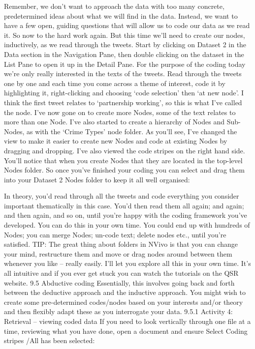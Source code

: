 \documentclass[
]{book}
\begin{document}
Remember, we don't want to approach the data with too many concrete, predetermined ideas about what we will find in the data. Instead, we want to have a few open, guiding questions that will allow us to code our data as we read it.
So now to the hard work again. But this time we'll need to create our nodes, inductively, as we read through the tweets.
Start by clicking on Dataset 2 in the Data section in the Navigation Pane, then double clicking on the dataset in the List Pane to open it up in the Detail Pane. For the purpose of the coding today we're only really interested in the texts of the tweets.
Read through the tweets one by one and each time you come across a theme of interest, code it by highlighting it, right-clicking and choosing `code selection' then `at new node'. I think the first tweet relates to `partnership working', so this is what I've called the node. I've now gone on to create more Nodes, some of the text relates to more than one Node. I've also started to create a hierarchy of Nodes and Sub-Nodes, as with the `Crime Types' node folder. As you'll see, I've changed the view to make it easier to create new Nodes and code at existing Nodes by dragging and dropping. I've also viewed the code stripes on the right hand side. You'll notice that when you create Nodes that they are located in the top-level Nodes folder. So once you've finished your coding you can select and drag them into your Dataset 2 Nodes folder to keep it all well organised:

In theory, you'd read through all the tweets and code everything you consider important thematically in this case. You'd then read them all again; and again; and then again, and so on, until you're happy with the coding framework you've developed. You can do this in your own time. You could end up with hundreds of Nodes; you can merge Nodes; un-code text; delete nodes etc., until you're satisfied.
TIP: The great thing about folders in NVivo is that you can change your mind, restructure them and move or drag nodes around between them whenever you like -- really easily. I'll let you explore all this in your own time. It's all intuitive and if you ever get stuck you can watch the tutorials on the QSR website.
9.5 Abductive coding
Essentially, this involves going back and forth between the deductive approach and the inductive approach. You might wish to create some pre-determined codes/nodes based on your interests and/or theory and then flexibly adapt these as you interrogate your data.
9.5.1 Activity 4: Retrieval -- viewing coded data
If you need to look vertically through one file at a time, reviewing what you have done, open a document and ensure Select Coding stripes /All has been selected:
\end{document}
